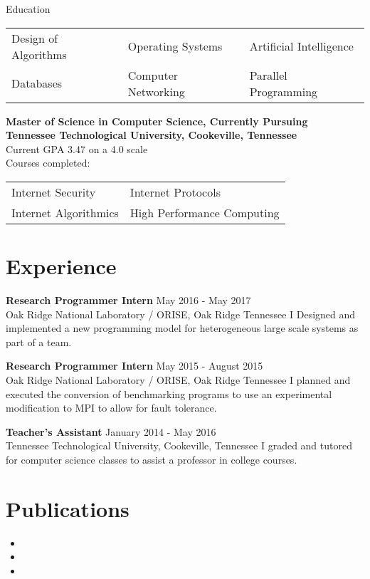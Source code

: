 \documentclass[10pt]{res}
\newcommand{\job}[5]{
    {\bf #1} \hfill #2 \\
    #3 #4
    #5
}
\begin{document}
\begin{resume}
\begin{section}{Education}
    \vspace{-0.15in}
    \begin{tabularx}{\textwidth}{l l l}
        Design of Algorithms & Operating Systems & Artificial Intelligence \\
        Databases & Computer Networking & Parallel Programming \\
    \end{tabularx}

    {\bf Master of Science in Computer Science, Currently Pursuing\\
    Tennessee Technological University, Cookeville, Tennessee} \\
    Current GPA 3.47 on a 4.0 scale \\
    Courses completed:

    \vspace{-0.15in}
    \begin{tabularx}{\textwidth}{l l}
        Internet Security & Internet Protocols \\
        Internet Algorithmics & High Performance Computing \\
    \end{tabularx}
\end{section}

\section{Experience}
\job{Research Programmer Intern} {May 2016 - May 2017} {Oak Ridge National Laboratory / ORISE, Oak Ridge Tennessee}
{
I Designed and implemented a new programming model for 
heterogeneous large scale systems as part of a team.
}

\job{Research Programmer Intern} {May 2015 - August 2015}
{Oak Ridge National Laboratory / ORISE, Oak Ridge Tennessee}
{
I planned and executed the conversion of benchmarking 
programs to use an experimental
modification to MPI to allow for fault tolerance.
}

\job{Teacher's Assistant} {January 2014 - May 2016}
{Tennessee Technological University, Cookeville, Tennessee}
{
I graded and tutored for computer science classes to assist a 
professor in college courses.
}

\section{Publications}
\begin{itemize}
    \item {}
    \item {}
    \item {}
\end{itemize}


\end{resume}
\end{document}
